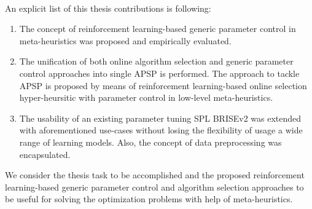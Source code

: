 \paragraph{}
An explicit list of this thesis contributions is following:
\begin{enumerate}
	\item The concept of reinforcement learning-based generic parameter control in meta-heuristics was proposed and empirically evaluated.%
	
	\item The unification of both online algorithm selection and generic parameter control approaches into single APSP is performed. The approach to tackle APSP is proposed by means of reinforcement learning-based online selection hyper-heursitic with parameter control in low-level meta-heuristics.

	\item The usability of an existing parameter tuning SPL BRISEv2 was extended with aforementioned use-cases without losing the flexibility of usage a wide range of learning models. Also, the concept of data preprocessing was encapsulated.
\end{enumerate}

We consider the thesis task to be accomplished and the proposed reinforcement learning-based generic parameter control and algorithm selection approaches to be useful for solving the optimization problems with help of meta-heuristics.